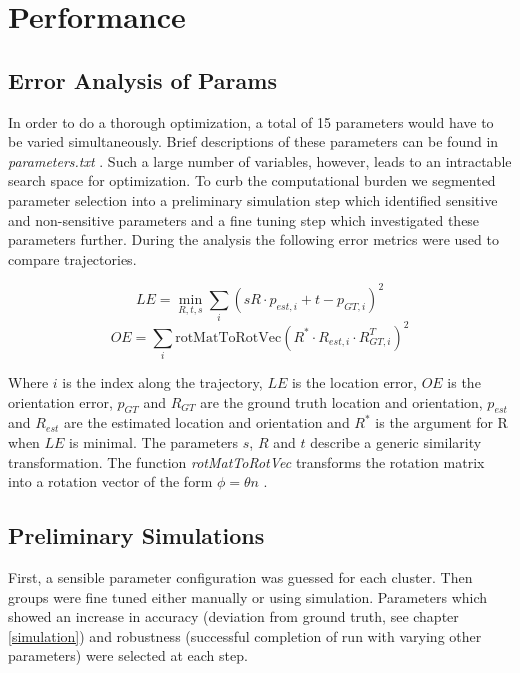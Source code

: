 \chapter{Performance}
\label{performance}

\section{Error Analysis of Params}

In order to do a thorough optimization, a total of 15 parameters would have to be varied simultaneously. 
Brief descriptions of these parameters can be found in \emph{parameters.txt} .
Such a large number of variables, however, leads to an intractable search space for optimization. 
To curb the computational burden we segmented parameter selection into a preliminary simulation step  which identified sensitive and non-sensitive parameters and a fine tuning step which investigated these parameters further. 
During the analysis the following error metrics were used to compare trajectories.

\begin{equation*}LE = \underset{R,t,s}{\min} \sum_i (s R \cdot p_{est, i} + t - p_{GT, i})^2\end{equation*}
\begin{equation*}OE = \sum_i \text{rotMatToRotVec}(R^* \cdot R_{est,i} \cdot R_{GT, i}^T)^2\end{equation*}

Where $i$ is the index along the trajectory, $LE$ is the location error, $OE$ is the orientation error, $p_{GT}$ and $R_{GT}$ are the ground truth location and orientation, $p_{est}$ and $R_{est}$ are the estimated location and orientation and $R^*$ is the argument for R when $LE$ is minimal. 
The parameters $s$, $R$ and $t$ describe a generic similarity transformation. 
The function \emph{rotMatToRotVec} transforms the rotation matrix into a rotation vector of the form $\phi = \theta n$ .

\section{Preliminary Simulations}

First, a sensible parameter configuration was guessed for each cluster. 
Then groups were fine tuned either manually or using simulation.  
Parameters which showed an increase in accuracy (deviation from ground truth, see chapter \ref{simulation}) and robustness (successful completion of run with varying other parameters) were selected at each step.

